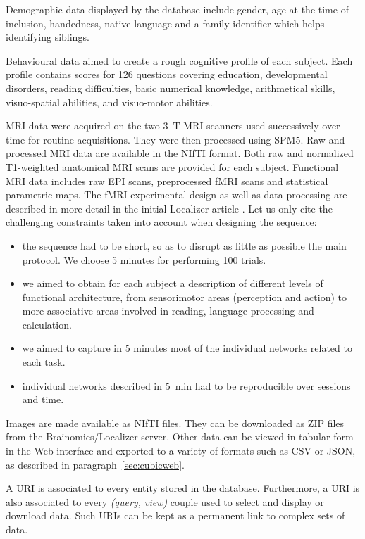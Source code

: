 \documentclass[preprint,review,12pt]{elsarticle}
\begin{document}
Demographic data displayed by the database include gender, age at the time of inclusion, handedness, native language and a family identifier which helps identifying siblings.

Behavioural data aimed to create a rough cognitive profile of each subject. Each profile contains scores for 126 questions covering education, developmental disorders, reading difficulties, basic numerical knowledge, arithmetical skills, visuo-spatial abilities, and visuo-motor abilities.

MRI data were acquired on the two 3~T MRI scanners used successively over time for routine acquisitions. They were then processed using SPM5. Raw and processed MRI data are available in the NIfTI format. Both raw and normalized T1-weighted anatomical MRI scans are provided for each subject. Functional MRI data includes raw EPI scans, preprocessed fMRI scans and statistical parametric maps. The fMRI experimental design as well as data processing are described in more detail in the initial Localizer article \cite{Pinel2007}. Let us only cite the challenging constraints taken into account when designing the sequence:
\begin{itemize}
\item the sequence had to be short, so as to disrupt as little as possible the main protocol. We choose 5 minutes for performing 100 trials.
\item we aimed to obtain for each subject a description of different levels of functional architecture, from sensorimotor areas (perception and action) to more associative areas involved in reading, language processing and calculation.
\item we aimed to capture in 5 minutes most of the individual networks related to each task.
\item individual networks described in 5~min had to be reproducible over sessions and time.
\end{itemize}

Images are made available as NIfTI files. They can be downloaded as ZIP files from the Brainomics/Localizer server. Other data can be viewed in tabular form in the Web interface and exported to a variety of formats such as CSV or JSON, as described in paragraph~\ref{sec:cubicweb}.

A URI is associated to every entity stored in the database. Furthermore, a URI is also associated to every \emph{(query, view)} couple used to select and display or download data. Such URIs can be kept as a permanent link to complex sets of data.
\end{document}
